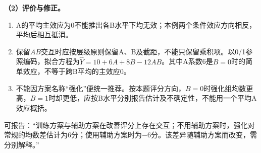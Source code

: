 \textbf{（2）评价与修正。}
\begin{enumerate}
\item A的平均主效应为0不能推出各B水平下均无效；本例两个条件效应方向相反，平均后相互抵消。
\item 保留\(AB\)交互时应按层级原则保留A、B及截距，不能只保留乘积项。以0/1参照编码，拟合方程为\(\widehat Y=10+6A+8B-12AB\)。其中A系数6是\(B=0\)时的简单效应，不等于跨B平均的主效应0。
\item 不能因方案名称“强化”便统一推荐。按本题评分方向，\(B=0\)时强化组均数更高，\(B=1\)时却更低，应按B水平分别报告估计及不确定性，不能用一个平均A效应概括。
\end{enumerate}
可报告：“训练方案与辅助方案在改善评分上存在交互；不用辅助方案时，强化对常规的均数差估计为6分；使用辅助方案时为\(-6\)分。该差异随辅助方案而改变，需分别解释。”
\par\nobreak\smallskip{}
